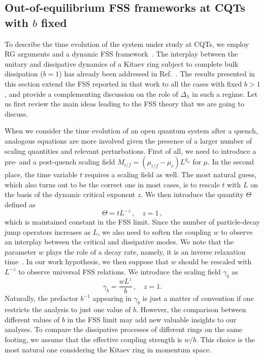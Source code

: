 \subsection{Out-of-equilibrium FSS frameworks at CQTs with $b$ fixed}
\label{sec_Out-of-equilibrium FSS at CQT}

To describe the time evolution of the system under study at CQTs, we employ RG arguments and a dynamic FSS framework~\cite{C-1996-ScalingandRG, RV-2021-coherentanddissipativedynamicsreview}. The interplay between the unitary and dissipative dynamics of a Kitaev ring subject to complete bulk dissipation ($b=1$) has already been addressed in Ref.~\cite{NRV-2019-competingdissipativeandcoherent}. The results presented in this section extend the FSS reported in that work to all the cases with fixed $b>1$, and provide a complementing discussion on the role of $\Delta_\lambda$ in such a regime. Let us first review the main ideas leading to the FSS theory that we are going to discuss.

When we consider the time evolution of an open quantum system after a quench, analogous equations are more involved given the presence of a larger number of scaling quantities and relevant perturbations. First of all, we need to introduce a pre- and a post-quench scaling field $M_{i/f}=(\mu_{i/f}-\mu_c)L^{y_\mu}$ for $\mu$. In the second place, the time variable $t$ requires a scaling field as well. The most natural guess, which also turns out to be the correct one in most cases, is to rescale $t$ with $L$ on the basis of the dynamic critical exponent $z$. We then introduce the quantity $\Theta$ defined as
\begin{equation}
    \Theta = t L^{-z}\,, \quad z=1\,,
    \label{eq_def_Theta_scaling}
\end{equation}
which is maintained constant in the FSS limit.
Since the number of particle-decay jump operators increases as $L$, we also need to soften the coupling $w$ to observe an interplay between the critical and dissipative modes. We note that the parameter $w$ plays the role of
a decay rate, namely, it is an inverse relaxation time~\cite{NRV-2019-competingdissipativeandcoherent, BP-openquantumsystembook}.
In our work hypothesis, we then suppose that $w$ should be rescaled with $L^{-z}$ to observe universal FSS relations. We introduce the scaling field $\gamma_b$ as
\begin{equation}
    \gamma_b=\frac{wL^{z}}{b}\,,\quad z=1.
    \label{def_gamma_scaling}
\end{equation}
Naturally, the prefactor $b^{-1}$ appearing in $\gamma_b$ is just a matter of convention if one restricts the analysis to just one value of $b$. However, the comparison between different values of $b$ in the FSS limit may add new valuable insights to our analyses. To compare the dissipative processes of different rings on the same footing, we assume that the effective coupling strength is $w/b$. This choice is the most natural one considering the Kitaev ring in momentum space. 

